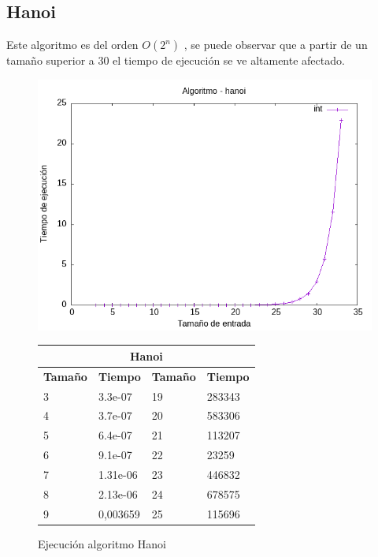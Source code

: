 \documentclass[11pt]{article}
\begin{document}
\subsection*{Hanoi}
Este algoritmo es del orden $O(2^n)$ , se puede observar que a partir de un tamaño superior a 30 el tiempo de ejecución se ve 
altamente afectado.
\begin{figure}[H]
    \begin{minipage}{0.5\textwidth}
        \centering
        \includegraphics[width=\linewidth]{assets/Img/hanoiint.png}
        \caption{Ejecución algoritmo Hanoi}
        \label{fig:hanoi} 
    \end{minipage}%
    \begin{minipage}{0.5\textwidth}
        \centering
        \small
        \begin{tabular}{|l|l|l|l|}
        \hline
            \multicolumn{4}{|c|}{\cellcolor{blue!20}\textbf{Hanoi}} \\ \hline 
            \textbf{Tamaño} & \textbf{Tiempo} & \textbf{Tamaño} & \textbf{Tiempo} \\ \hline
            3 & 3.3e-07 & 19 & 283343 \\ \hline
            4 & 3.7e-07 & 20 & 583306 \\ \hline
            5 & 6.4e-07 & 21 & 113207 \\ \hline
            6 & 9.1e-07 & 22 & 23259 \\ \hline
            7 & 1.31e-06 & 23 & 446832 \\ \hline
            8 & 2.13e-06 & 24 & 678575 \\ \hline
            9 & 0,003659 & 25 & 115696 \\ \hline

\end{tabular}
\end{minipage}
\end{figure}
\end{document}
